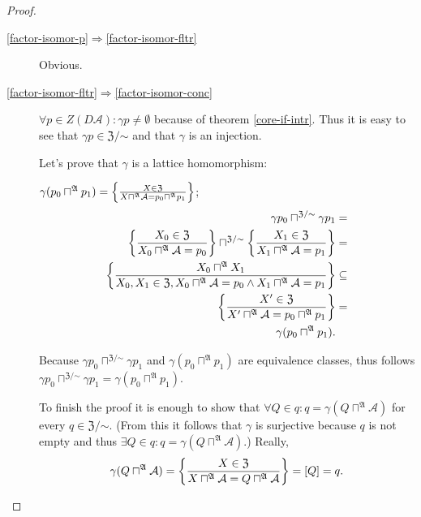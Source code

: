 \begin{proof}
~
\begin{description}
\item [{\ref{factor-isomor-p}$\Rightarrow$\ref{factor-isomor-fltr}}] Obvious.
\item [{\ref{factor-isomor-fltr}$\Rightarrow$\ref{factor-isomor-conc}}] $\forall p\in Z(D\mathcal{A}):\gamma p\ne\emptyset$
because of theorem \ref{core-if-intr}. Thus it is easy to see that
$\gamma p\in\mathfrak{Z}/\mathord\sim$ and that $\gamma$ is an injection.


Let's prove that $\gamma$ is a lattice homomorphism:


$\gamma(p_{0}\sqcap^{\mathfrak{A}}p_{1})=\left\{ \frac{X\in\mathfrak{Z}}{X\sqcap^{\mathfrak{A}}\mathcal{A}=p_{0}\sqcap^{\mathfrak{A}}p_{1}}\right\}$;
\begin{align*}
\gamma p_{0}\sqcap^{\mathfrak{Z}/\mathord\sim}\gamma p_{1} & =\\
\left\{ \frac{X_{0}\in\mathfrak{Z}}{X_{0}\sqcap^{\mathfrak{A}}\mathcal{A}=p_{0}}\right\}\sqcap^{\mathfrak{Z}/\mathord\sim}\left\{ \frac{X_{1}\in\mathfrak{Z}}{X_{1}\sqcap^{\mathfrak{A}}\mathcal{A}=p_{1}}\right\} & =\\
\left\{ \frac{X_{0}\sqcap^{\mathfrak{A}}X_{1}}{X_{0},X_{1}\in\mathfrak{Z},X_{0}\sqcap^{\mathfrak{A}}\mathcal{A}=p_{0}\land X_{1}\sqcap^{\mathfrak{A}}\mathcal{A}=p_{1}}\right\} & \subseteq\\
\left\{ \frac{X'\in\mathfrak{Z}}{X'\sqcap^{\mathfrak{A}}\mathcal{A}=p_{0}\sqcap^{\mathfrak{A}}p_{1}}\right\} & =\\
\gamma(p_{0}\sqcap^{\mathfrak{A}}p_{1}).
\end{align*}



Because $\gamma p_{0}\sqcap^{\mathfrak{Z}/\mathord\sim}\gamma p_{1}$
and $\gamma(p_{0}\sqcap^{\mathfrak{A}}p_{1})$ are equivalence classes,
thus follows $\gamma p_{0}\sqcap^{\mathfrak{Z}/\mathord\sim}\gamma p_{1}=\gamma(p_{0}\sqcap^{\mathfrak{A}}p_{1})$.


To finish the proof it is enough to show that $\forall Q\in q:q=\gamma(Q\sqcap^{\mathfrak{A}}\mathcal{A})$
for every $q\in\mathfrak{Z}/\mathord\sim$. (From this it follows
that $\gamma$ is surjective because $q$ is not empty and thus $\exists Q\in q:q=\gamma(Q\sqcap^{\mathfrak{A}}\mathcal{A})$.)
Really,
\[
\gamma(Q\sqcap^{\mathfrak{A}}\mathcal{A})=\left\{ \frac{X\in\mathfrak{Z}}{X\sqcap^{\mathfrak{A}}\mathcal{A}=Q\sqcap^{\mathfrak{A}}\mathcal{A}}\right\}=[Q]=q.
\]


\end{description}
\end{proof}
